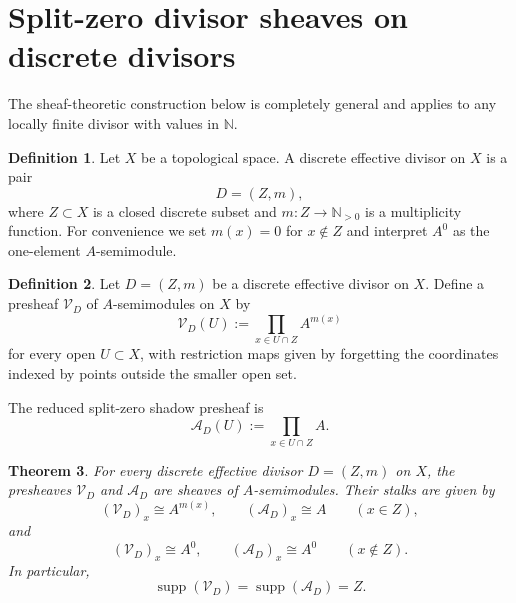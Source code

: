 \documentclass[11pt,a4paper]{article}
\newtheorem{theorem}{Theorem}[section]
\theoremstyle{definition}
\newtheorem{definition}[theorem]{Definition}
\theoremstyle{remark}
\DeclareMathOperator{\supp}{supp}
\newcommand{\NN}{\mathbb N}
\begin{document}
\section{Split-zero divisor sheaves on discrete divisors}

The sheaf-theoretic construction below is completely general and applies to any locally finite divisor with values in \(\NN\).

\begin{definition}
Let \(X\) be a topological space. A discrete effective divisor on \(X\) is a pair
\[
D=(Z,m),
\]
where \(Z\subset X\) is a closed discrete subset and \(m:Z\to\NN_{>0}\) is a multiplicity function.
For convenience we set \(m(x)=0\) for \(x\notin Z\) and interpret \(A^0\) as the one-element \(A\)-semimodule.
\end{definition}

\begin{definition}
Let \(D=(Z,m)\) be a discrete effective divisor on \(X\). Define a presheaf \(\mathcal V_D\) of \(A\)-semimodules on \(X\) by
\[
\mathcal V_D(U):=\prod_{x\in U\cap Z} A^{m(x)}
\]
for every open \(U\subset X\), with restriction maps given by forgetting the coordinates indexed by points outside the smaller open set.

The reduced split-zero shadow presheaf is
\[
\mathcal A_D(U):=\prod_{x\in U\cap Z}A.
\]
\end{definition}

\begin{theorem}
For every discrete effective divisor \(D=(Z,m)\) on \(X\), the presheaves \(\mathcal V_D\) and \(\mathcal A_D\) are sheaves of \(A\)-semimodules.
Their stalks are given by
\[
(\mathcal V_D)_x\cong A^{m(x)},
\qquad
(\mathcal A_D)_x\cong A
\qquad (x\in Z),
\]
and
\[
(\mathcal V_D)_x\cong A^0,
\qquad
(\mathcal A_D)_x\cong A^0
\qquad (x\notin Z).
\]
In particular,
\[
\supp(\mathcal V_D)=\supp(\mathcal A_D)=Z.
\]
\end{theorem}
\end{document}
